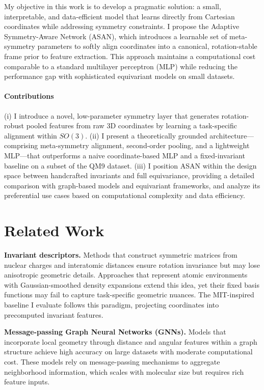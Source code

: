 \documentclass[12pt]{article}
\begin{document}
My objective in this work is to develop a pragmatic solution: a small, interpretable, and data-efficient model that learns directly from Cartesian coordinates while addressing symmetry constraints. I propose the Adaptive Symmetry-Aware Network (ASAN), which introduces a learnable set of meta-symmetry parameters to softly align coordinates into a canonical, rotation-stable frame prior to feature extraction. This approach maintains a computational cost comparable to a standard multilayer perceptron (MLP) while reducing the performance gap with sophisticated equivariant models on small datasets.

\paragraph{Contributions} (i) I introduce a novel, low-parameter symmetry layer that generates rotation-robust pooled features from raw 3D coordinates by learning a task-specific alignment within $SO(3)$. (ii) I present a theoretically grounded architecture—comprising meta-symmetry alignment, second-order pooling, and a lightweight MLP—that outperforms a naive coordinate-based MLP and a fixed-invariant baseline on a subset of the QM9 dataset. (iii) I position ASAN within the design space between handcrafted invariants and full equivariance, providing a detailed comparison with graph-based models and equivariant frameworks, and analyze its preferential use cases based on computational complexity and data efficiency.

\section{Related Work}
\textbf{Invariant descriptors.} Methods that construct symmetric matrices from nuclear charges and interatomic distances ensure rotation invariance but may lose anisotropic geometric details. Approaches that represent atomic environments with Gaussian-smoothed density expansions extend this idea, yet their fixed basis functions may fail to capture task-specific geometric nuances. The MIT-inspired baseline I evaluate follows this paradigm, projecting coordinates into precomputed invariant features.

\textbf{Message-passing Graph Neural Networks (GNNs).} Models that incorporate local geometry through distance and angular features within a graph structure achieve high accuracy on large datasets with moderate computational cost. These models rely on message-passing mechanisms to aggregate neighborhood information, which scales with molecular size but requires rich feature inputs.
\end{document}
